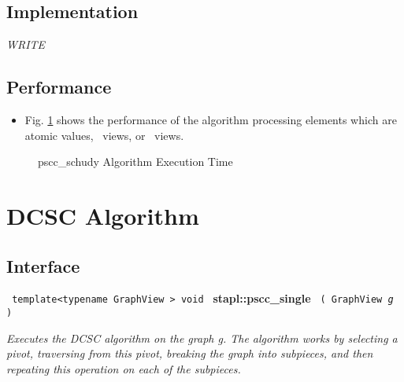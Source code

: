\subsection{Implementation} \label{sec-pscc-schudy-alg-impl}

\textit{WRITE}

\subsection{Performance} \label{sec-pscc-schudy-alg-perf}

\begin{itemize}
\item
Fig. \ref{fig:pscc-schudy-alg-exec-exper}
shows the performance of the algorithm processing
elements which are atomic values, \stl\ views, or \stapl\ views.
\end{itemize}

\begin{figure}[p]
\caption{ pscc\_schudy Algorithm Execution Time}
\label{fig:pscc-schudy-alg-exec-exper}
\end{figure}


\section{DCSC Algorithm}
\label{sec-pscc-single-alg}

\subsection{Interface} \label{sec-pscc-single-alg-inter}

\noindent
\texttt{%
template<typename GraphView >
\newline
void 
}
\newline
\textbf{stapl::pscc\_single}
\newline
\texttt{%
(
GraphView
\textit{g}%
)    
}
\vspace{0.4cm}

\textit{
Executes the DCSC algorithm on the graph g. The algorithm works by selecting a pivot, traversing from this pivot, breaking the graph into subpieces, and then repeating this operation on each of the subpieces.
}
\vspace{0.4cm}


